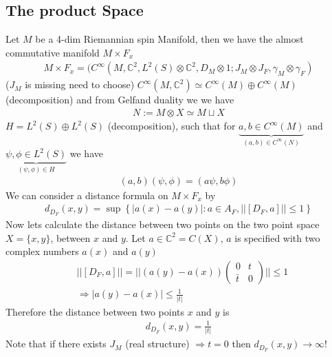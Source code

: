 \documentclass[a4paper]{article}
\theoremstyle{definition}
\theoremstyle{definition}
\theoremstyle{definition}
\theoremstyle{theorem}
\theoremstyle{theorem}
\theoremstyle{theorem}
\begin{document}
    \subsection{The product Space}
    Let $M$ be a 4-dim Riemannian spin Manifold, then we have the almost
    commutative manifold $M\times F_x$
    \begin{align}
        M\times F_x = (C^\infty(M, \mathbb{C}^2, L^2(S)\otimes \mathbb{C}^2,
        D_M\otimes 1 ; J_M\otimes J_F, \gamma_M \otimes \gamma_F)
    \end{align}
    ($J_M$ is missing need to choose)\newline
    $C^\infty(M, \mathbb{C}^2) \simeq C^\infty(M) \oplus  C^\infty(M)$
    (decomposition) and from Gelfand duality we we have
    \begin{align}
        N:= M\otimes X \simeq M\sqcup X
    \end{align}
    $H = L^2(S) \oplus L^2(S)$ (decomposition), such that for
    $\underbrace{a,b
    \in C^\infty(M)}_{(a, b) \in C^\infty(N)}$
    and $\underbrace{\psi, \phi \in L^2(S)}_{(\psi, \phi) \in H}$ we have
    \begin{align}
        (a, b)(\psi, \phi) = (a\psi, b\phi)
    \end{align}
    We can consider a distance formula on $M\times F_x$ by
    \begin{align}
        d_{D_F}(x,y) = \sup\left\{  |a(x) - a(y)|:a\in A_F, ||[D_F, a]|| \leq
        1 \right\}
    \end{align}
    Now lets calculate the distance between two points on the two point space
    $X=
    \{x, y\}$, between $x$ and $y$. Let $a \in \mathbb{C}^2 = C(X)$, $a$ is
    specified with two complex numbers $a(x)$ and $a(y)$
    \begin{align}
        &||[D_F , a]|| = ||(a(y) - a(x))\begin{pmatrix}0 &t\\\bar{t} &0
        \end{pmatrix}|| \leq 1\\
        &\Rightarrow |a(y) - a(x)|\leq \frac{1}{|t|}
    \end{align}
    Therefore the distance between two points $x$ and $y$ is
    \begin{align}
        d_{D_F} (x,y) = \frac{1}{|t|}
    \end{align}
    Note that if there exists $J_M$ (real structure) $\Rightarrow t=0$ then
    $d_{D_F}(x,y) \rightarrow \infty$!
    \newline
\end{document}
